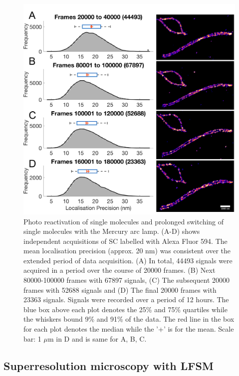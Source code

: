 \documentclass[9pt,twocolumn,twoside]{pnas-new}
\begin{document}
\begin{figure}[h!]
\begin{center}
\includegraphics[width=\linewidth]{Figures/Fig4.png}
\end{center}
\caption[]{Photo reactivation of single molecules and prolonged switching of single molecules with the Mercury arc lamp. (A-D) shows independent acquisitions of SC labelled with Alexa Fluor 594. The mean localisation precision (approx. 20 nm) was consistent over the extended period of data acquisition. (A) In total, 44493 signals were acquired in a period over the course of 20000 frames. (B) Next 80000-100000 frames with 67897 signals, (C) The subsequent 20000 frames with 52688 signals and (D) The final 20000 frames with 23363 signals. Signals were recorded over a period of 12 hours. The blue box above each plot denotes the 25\% and 75\% quartiles while the whiskers bound 9\% and 91\% of the data. The red line in the box for each plot denotes the median while the '+' is for the mean. Scale bar: 1 $\mu$m in D and is same for A, B, C. } \label{fig:indefinite}
\end{figure}

\subsection*{Superresolution microscopy with LFSM}
\end{document}
